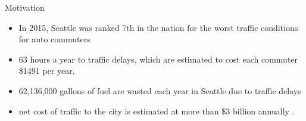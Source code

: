 {

}

\begin{frame}{Motivation}
\begin{itemize}
  \item In 2015, Seattle was ranked 7th in the nation for the worst traffic conditions for auto commuters
  \item 63 hours a year to traffic delays, which are estimated to cost each commuter \$1491 per year.
  \item 62,136,000 gallons of fuel are wasted each year in Seattle due to traffic delays
  \item net cost of traffic to the city is estimated at more than \$3 billion annually \cite{Schrank20152015Scorecard}.
\end{itemize}
\end{frame}